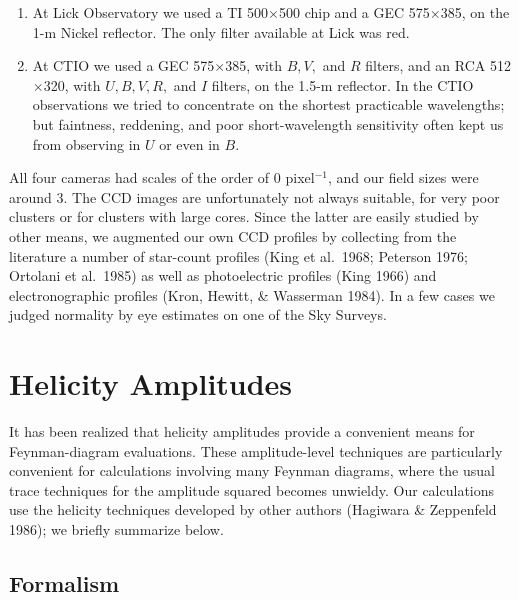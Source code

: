 \documentclass[11pt,twoside]{article}  %
\begin{document}
\begin{enumerate}
\item At Lick Observatory we used a TI 500$\times$500 chip 
and a GEC 575$\times$385, on the 1-m Nickel reflector.  The only
filter available at Lick was red.
\item At CTIO we used a GEC 575$\times$385, with
$B, V,$ and $R$ filters, and an RCA 512$\times$320, with $U, B, V, R,$
and $I$ filters, on the 1.5-m reflector. In the CTIO observations we
tried to concentrate on the shortest practicable wavelengths; but
faintness, reddening, and poor short-wavelength sensitivity often kept
us from observing in $U$ or even in $B$.
\end{enumerate}

All four cameras had scales of the order of 0 pixel$^{-1}$, and our
field sizes were around 3\arcmin.
%
The CCD images are unfortunately not always suitable, for very poor
clusters or for clusters with large cores.  Since the latter are
easily studied by other means, we augmented our own CCD profiles by
collecting from the literature a number of star-count profiles (King
et al.\ 1968; Peterson 1976; Ortolani et al.\ 1985) as well as
photoelectric profiles (King 1966) and electronographic profiles (Kron,
Hewitt, \& Wasserman 1984).  In a few cases we judged normality by eye estimates on
one of the Sky Surveys.


\section{Helicity Amplitudes}

It has been realized that helicity amplitudes provide a convenient
means for Feynman-diagram evaluations.  These amplitude-level
techniques are particularly convenient for calculations involving many
Feynman diagrams, where the usual trace techniques for the amplitude
squared becomes unwieldy.  Our calculations use the helicity
techniques developed by other authors (Hagiwara \& Zeppenfeld 1986);
we briefly summarize below.

\subsection{Formalism} \label{hairymath}
\end{document}
